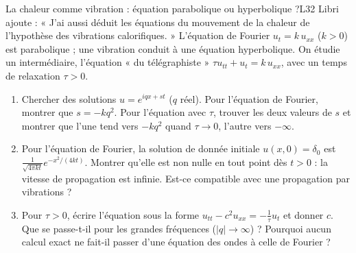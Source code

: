 \documentclass[11pt,a4paper]{article}
\begin{document}
\begin{exercice}{La chaleur comme vibration : équation parabolique ou hyperbolique ?}{L3}{2}
Libri ajoute : « J'ai aussi déduit les équations du mouvement de la chaleur de
l'hypothèse des vibrations calorifiques. » L'équation de Fourier
$u_t = k\,u_{xx}$ ($k > 0$) est parabolique ; une vibration conduit à une équation
hyperbolique. On étudie un intermédiaire, l'équation « du télégraphiste »
$\tau u_{tt} + u_t = k\,u_{xx}$, avec un temps de relaxation $\tau > 0$.
\begin{enumerate}
\item Chercher des solutions $u = e^{iqx + st}$ ($q$ réel). Pour l'équation de Fourier,
  montrer que $s = -kq^2$. Pour l'équation avec $\tau$, trouver les deux valeurs de $s$
  et montrer que l'une tend vers $-kq^2$ quand $\tau \to 0$, l'autre vers $-\infty$.
\item Pour l'équation de Fourier, la solution de donnée initiale $u(x,0) = \delta_0$ est
  $\frac{1}{\sqrt{4\pi kt}}e^{-x^2/(4kt)}$. Montrer qu'elle est non nulle en tout point
  dès $t > 0$ : la vitesse de propagation est infinie. Est-ce compatible avec une
  propagation par vibrations ?
\item Pour $\tau > 0$, écrire l'équation sous la forme $u_{tt} - c^2u_{xx} = -\frac1\tau u_t$
  et donner $c$. Que se passe-t-il pour les grandes fréquences ($|q| \to \infty$) ?
  Pourquoi aucun calcul exact ne fait-il passer d'une équation des ondes à celle de
  Fourier ?
\end{enumerate}
\end{exercice}
\end{document}
